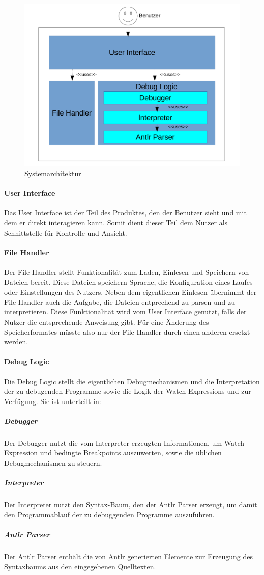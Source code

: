 \documentclass[parskip=full]{scrartcl}
\let\glsplgen\glsuseri
\begin{document}
\begin{figure}[!ht]
	\centering
	\includegraphics[width=1.0\textwidth]{Architektur}
	\caption{Systemarchitektur}
	\label{fig:Bild3} 

\end{figure}
\vspace{0.7cm}
	\paragraph{User Interface} Das User Interface ist der Teil des Produktes, den der Benutzer sieht und mit dem er direkt interagieren kann. Somit dient dieser Teil dem Nutzer als Schnittstelle für Kontrolle und Ansicht. 
	\paragraph{File Handler} Der File Handler stellt Funktionalität zum Laden, Einlesen und Speichern von Dateien bereit. Diese Dateien speichern Sprache, die Konfiguration eines Laufes oder Einstellungen des Nutzers. Neben dem eigentlichen Einlesen übernimmt der File Handler auch die Aufgabe, die Dateien entprechend zu parsen und zu interpretieren. Diese Funktionalität wird vom User Interface genutzt, falls der Nutzer die entsprechende Anweisung gibt. Für eine Änderung des Speicherformates müsste also nur der File Handler durch einen anderen ersetzt werden.
	\paragraph{Debug Logic} Die Debug Logic stellt die eigentlichen Debugmechanismen und die Interpretation der zu debugenden Programme sowie die Logik der \glspl{Watch-Expression} und \glsplgen{bedingter Breakpoint} zur Verfügung. Sie ist unterteilt in: 
	\subparagraph{Debugger} Der Debugger nutzt die vom \gls{Interpreter} erzeugten Informationen, um Watch-Expression und bedingte Breakpoints auszuwerten, sowie die üblichen Debugmechanismen zu steuern.
	\subparagraph{Interpreter} Der Interpreter nutzt den Syntax-Baum, den der Antlr Parser erzeugt, um damit den Programmablauf der zu debuggenden Programme auszuführen. 
	\subparagraph{Antlr Parser} Der Antlr Parser enthält die von Antlr generierten Elemente zur Erzeugung des Syntaxbaums aus den eingegebenen Quelltexten.
	
\end{document}
